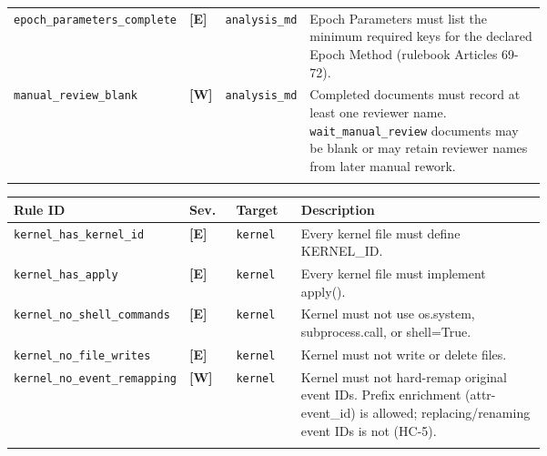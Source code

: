 \begin{tcolorbox}
\begin{tabular}{@{}p{0.22\linewidth}ll p{0.46\linewidth}@{}}
\addlinespace[1pt]
\texttt{epoch\_\allowbreak{}parameters\_\allowbreak{}complete} & \textbf{[E]} & \texttt{analysis\_md} & Epoch Parameters must list the minimum required keys for the declared Epoch Method (rulebook Articles 69-72). \\
\addlinespace[1pt]
\texttt{manual\_\allowbreak{}review\_\allowbreak{}blank} & \textbf{[W]} & \texttt{analysis\_md} & Completed documents must record at least one reviewer name. \texttt{wait\_manual\_review} documents may be blank or may retain reviewer names from later manual rework. \\
\addlinespace[1pt]
\bottomrule
\end{tabular}
\endgroup
\smallskip{}\par\smallskip
\begingroup\footnotesize
\begin{tabular}{@{}p{0.22\linewidth}ll p{0.46\linewidth}@{}}
\toprule
\textbf{Rule ID} & \textbf{Sev.} & \textbf{Target} & \textbf{Description} \\
\midrule
\texttt{kernel\_\allowbreak{}has\_\allowbreak{}kernel\_\allowbreak{}id} & \textbf{[E]} & \texttt{kernel} & Every kernel file must define KERNEL\_ID. \\
\addlinespace[1pt]
\texttt{kernel\_\allowbreak{}has\_\allowbreak{}apply} & \textbf{[E]} & \texttt{kernel} & Every kernel file must implement apply(). \\
\addlinespace[1pt]
\texttt{kernel\_\allowbreak{}no\_\allowbreak{}shell\_\allowbreak{}commands} & \textbf{[E]} & \texttt{kernel} & Kernel must not use os.system, subprocess.call, or shell=True. \\
\addlinespace[1pt]
\texttt{kernel\_\allowbreak{}no\_\allowbreak{}file\_\allowbreak{}writes} & \textbf{[E]} & \texttt{kernel} & Kernel must not write or delete files. \\
\addlinespace[1pt]
\texttt{kernel\_\allowbreak{}no\_\allowbreak{}event\_\allowbreak{}remapping} & \textbf{[W]} & \texttt{kernel} & Kernel must not hard-remap original event IDs. Prefix enrichment (attr-event\_id) is allowed; replacing/renaming event IDs is not (HC-5). \\
\addlinespace[1pt]
\bottomrule
\end{tabular}
\endgroup
\end{tcolorbox}